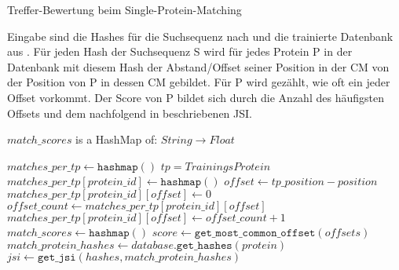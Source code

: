 \begin{enumerate}[a)]
                \newcommand{\Width}{\dimexpr\textwidth-\leftmargin}
                \begin{minipage}{\Width}
                    \begin{algorithm}[H]
                        \caption{Treffer-Bewertung beim Single-Protein-Matching}\label{alg:scoring}
                        Eingabe sind die Hashes für die Suchsequenz nach  und die trainierte Datenbank aus . Für jeden Hash der Suchsequenz S wird für jedes Protein P in der Datenbank mit diesem Hash der Abstand/Offset seiner Position in der \acf{CM} von der Position von P in dessen \acs{CM} gebildet. Für P wird gezählt, wie oft ein jeder Offset vorkommt. Der Score von P bildet sich durch die Anzahl des häufigsten Offsets und dem nachfolgend in  beschriebenen \acl{JSI}.
                        \begin{algorithmic}[1]
                            \Ensure $match\_scores$ is a HashMap of: $String \rightarrow Float$

                            \State $matches\_per\_tp \gets \texttt{hashmap}()$ \Comment $tp=Trainings Protein$
                                            \State $matches\_per\_tp[protein\_id] \gets \texttt{hashmap}()$
                                        \EndIf
                                        \State $offset \gets tp\_position - position$
                                            \State $matches\_per\_tp[protein\_id][offset] \gets 0$
                                        \EndIf
                                        \State $offset\_count \gets matches\_per\_tp[protein\_id][offset]$
                                        \State $matches\_per\_tp[protein\_id][offset] \gets offset\_count + 1$
                                    \EndFor
                                \EndIf
                            \EndFor
                            \State $match\_scores \gets \texttt{hashmap}()$
                                \State $score \gets \texttt{get\_most\_common\_offset}(offsets)$
                                \State $match\_protein\_hashes \gets database.\texttt{get\_hashes}(protein)$
                                \State $jsi \gets \texttt{get\_jsi}(hashes, match\_protein\_hashes)$


\end{algorithmic}
\end{algorithm}
\end{minipage}
\end{enumerate}
